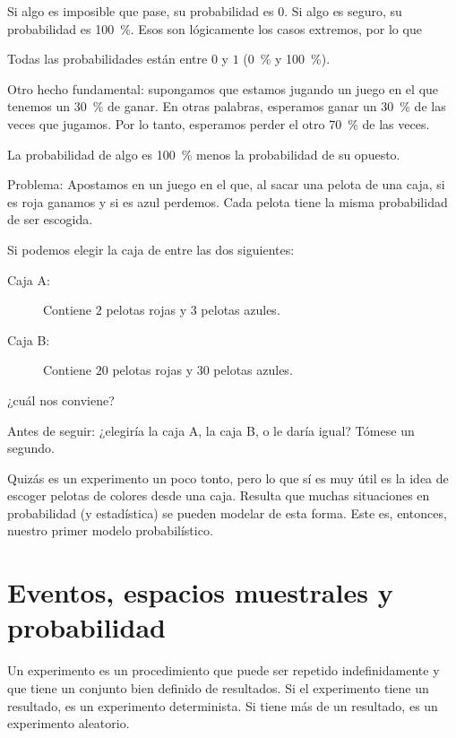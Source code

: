 Si algo es imposible que pase, su probabilidad es \(0\). Si algo es seguro, su probabilidad es \qty{100}{\percent}. Esos son lógicamente los casos extremos, por lo que
\begin{remark}
	Todas las probabilidades están entre \(0\) y \(1\) (\qty{0}{\percent} y \qty{100}{\percent}).
\end{remark}

Otro hecho fundamental: supongamos que estamos jugando un juego en el que tenemos un \qty{30}{\percent} de ganar. En otras palabras, esperamos ganar un \qty{30}{\percent} de las veces que jugamos. Por lo tanto, esperamos perder el otro \qty{70}{\percent} de las veces.

\begin{remark}
	La probabilidad de algo es \qty{100}{\percent} menos la probabilidad de su opuesto.
\end{remark}

Problema: Apostamos en un juego en el que, al sacar una pelota de una caja, si es roja ganamos y si es azul perdemos. Cada pelota tiene la misma probabilidad de ser escogida.

Si podemos elegir la caja de entre las dos siguientes:
\begin{description}
	\item[Caja A:] Contiene \(2\) pelotas rojas y \(3\) pelotas azules.
	\item[Caja B:] Contiene \(20\) pelotas rojas y \(30\) pelotas azules.
\end{description}
¿cuál nos conviene?

\begin{pausa}
Antes de seguir: ¿elegiría la caja A, la caja B, o le daría igual? Tómese un segundo.
\end{pausa}

Quizás es un experimento un poco tonto, pero lo que sí es muy útil es la idea de escoger pelotas de colores desde una caja. Resulta que muchas situaciones en probabilidad (y estadística) se pueden modelar de esta forma. Este es, entonces, nuestro primer modelo probabilístico.

\formal
\section{Eventos, espacios muestrales y probabilidad}

Un experimento es un procedimiento que puede ser repetido indefinidamente y que tiene un conjunto bien definido de resultados. Si el experimento tiene un resultado, es un experimento determinista. Si tiene más de un resultado, es un experimento aleatorio.

